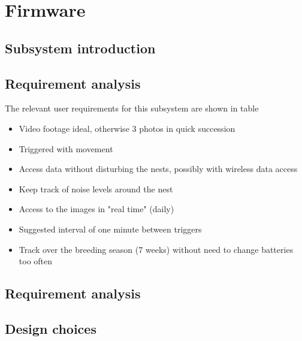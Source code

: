 %
%
%
\chapter{Firmware \label{ch:firmware}}


\section{Subsystem introduction}

\section{Requirement analysis}
The relevant user requirements for this subsystem are shown in table


\begin{itemize}
    \item Video footage ideal, otherwise 3 photos in quick succession
    \item Triggered with movement
    \item Access data without disturbing the nests, possibly with wireless data access
    \item Keep track of noise levels around the nest
    \item Access to the images in "real time" (daily)
    \item Suggested interval of one minute between triggers
    \item Track over the breeding season (7 weeks) without need to change batteries too often
\end{itemize}


\section{Requirement analysis}

\section{Design choices}

